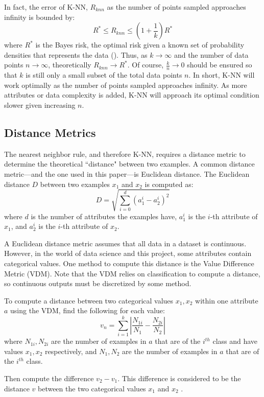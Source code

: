 \documentclass[twoside,11pt]{article}
\begin{document}
In fact, the error of K-NN, $R_{knn}$ as the number of points sampled approaches infinity is bounded by:
$$R^* \leq R_{knn} \leq (1+\frac{1}{k})R^*$$
where $R^*$ is the Bayes risk, the optimal risk given a known set of probability densities that represents the data (\cite{NNClassificationOrigPaper}). Thus, as $k \rightarrow \infty$ and the number of data points $n \rightarrow \infty$, theoretically $R_{knn} \rightarrow R^*$. Of course, $\frac{k}{n} \rightarrow 0$ should be ensured so that $k$ is still only a small subset of the total data points $n$. In short, K-NN will work optimally as the number of points sampled approaches infinity. As more attributes or data complexity is added, K-NN will approach its optimal condition slower given increasing $n$.


\subsection{Distance Metrics}

The nearest neighbor rule, and therefore K-NN, requires a distance metric to determine the theoretical ``distance" between two examples. A common distance metric---and the one used in this paper---is Euclidean distance. The Euclidean distance $D$ between two examples $x_1$ and $x_2$ is computed as:
$$D = \sqrt{\sum_{i=0}^{d}(a_1^i - a_2^i)^2}$$
where $d$ is the number of attributes the examples have, $a_1^i$ is the $i$-th attribute of $x_1$, and $a_2^i$ is the $i$-th attribute of $x_2$.

A Euclidean distance metric assumes that all data in a dataset is continuous. However, in the world of data science and this project, some attributes contain categorical values. One method to compute this distance is the Value Difference Metric (VDM). Note that the VDM relies on classification to compute a distance, so continuous outputs must be discretized by some method.

To compute a distance between two categorical values $x_1, x_2$ within one attribute $a$ using the VDM, find the following for each value:
$$ v_n = \sum _{i = 1}^{k} | \dfrac{N_{1i}}{N_1} - \dfrac{N_{2i}}{N_2} | $$
where $N_{1i}, N_{2i}$ are the number of examples in $a$ that are of the $i^{th}$ class and have values $x_1, x_2$ respectively, and $N_1, N_2$ are the number of examples in $a$ that are of the $i^{th}$ class.

Then compute the difference
$v_2 - v_1$.
This difference is considered to be the distance $v$ between the two categorical values $x_1$ and $x_2$ \citep{vdm}.
\end{document}

